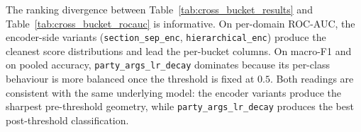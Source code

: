 The ranking divergence between Table~\ref{tab:cross_bucket_results}
and Table~\ref{tab:cross_bucket_rocauc} is informative. On per-domain
ROC-AUC, the encoder-side variants (\texttt{section\_sep\_enc},
\texttt{hierarchical\_enc}) produce the cleanest score distributions
and lead the per-bucket columns. On macro-F1 and on pooled accuracy,
\texttt{party\_args\_lr\_decay} dominates because its per-class
behaviour is more balanced once the threshold is fixed at $0.5$.
Both readings are consistent with the same underlying model: the
encoder variants produce the sharpest pre-threshold geometry, while
\texttt{party\_args\_lr\_decay} produces the best post-threshold
classification.
